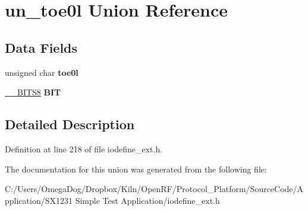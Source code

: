 \hypertarget{unionun__toe0l}{\section{un\-\_\-toe0l Union Reference}
\label{unionun__toe0l}
}
\subsection*{Data Fields}
\begin{DoxyCompactItemize}
\item 
\hypertarget{unionun__toe0l_ab3756e55947e89dfa890c243b436fb10}{unsigned char {\bfseries toe0l}}\label{unionun__toe0l_ab3756e55947e89dfa890c243b436fb10}

\item 
\hypertarget{unionun__toe0l_a6e7f22c8d28811d4d30d308289b41b2b}{\hyperlink{struct_____b_i_t_s8}{\-\_\-\-\_\-\-B\-I\-T\-S8} {\bfseries B\-I\-T}}\label{unionun__toe0l_a6e7f22c8d28811d4d30d308289b41b2b}

\end{DoxyCompactItemize}


\subsection{Detailed Description}


Definition at line 218 of file iodefine\-\_\-ext.\-h.



The documentation for this union was generated from the following file\-:\begin{DoxyCompactItemize}
\item 
C\-:/\-Users/\-Omega\-Dog/\-Dropbox/\-Kiln/\-Open\-R\-F/\-Protocol\-\_\-\-Platform/\-Source\-Code/\-Application/\-S\-X1231 Simple Test Application/iodefine\-\_\-ext.\-h\end{DoxyCompactItemize}
